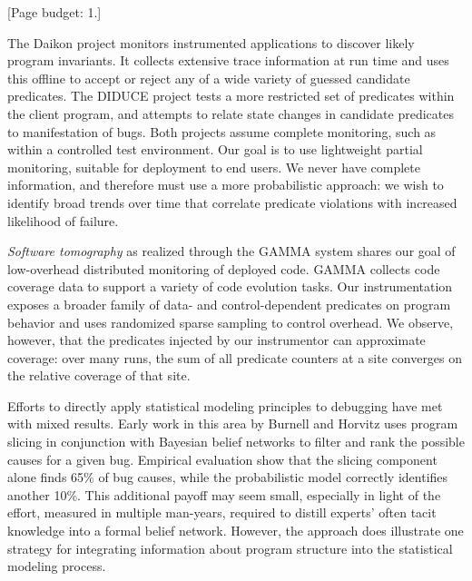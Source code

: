 \documentclass{sig-alternate}
\newcommand{\termdef}[1]{\textit{#1}}
\newcommand{\placeholder}[1]{{\color[cmyk]{0,0.61,0.87,0}[#1]}}
\begin{document}
\placeholder{Page budget: 1.}

The Daikon project \cite{ernst2001} monitors instrumented applications
to discover likely program invariants.  It collects extensive trace
information at run time and uses this offline to accept or reject any
of a wide variety of guessed candidate predicates.  The DIDUCE project
\cite{ICSE02*291} tests a more restricted set of predicates within the
client program, and attempts to relate state changes in candidate
predicates to manifestation of bugs.  Both projects assume complete
monitoring, such as within a controlled test environment.  Our goal is
to use lightweight partial monitoring, suitable for deployment to end
users.  We never have complete information, and therefore must use a
more probabilistic approach: we wish to identify broad trends over
time that correlate predicate violations with increased likelihood of
failure.

\termdef{Software tomography} as realized through the GAMMA system
\cite{PASTE'02*2,Orso:2003:LFDIART} shares our goal of low-overhead
distributed monitoring of deployed code.  GAMMA collects code coverage
data to support a variety of code evolution tasks.  Our
instrumentation exposes a broader family of data- and
control-dependent predicates on program behavior and uses randomized
sparse sampling to control overhead.  We observe, however, that the
predicates injected by our instrumentor can approximate coverage: over
many runs, the sum of all predicate counters at a site converges on
the relative coverage of that site.

Efforts to directly apply statistical modeling principles to debugging
have met with mixed results.  Early work in this area by Burnell and
Horvitz \cite{Burnell:1995:SCM} uses program slicing in conjunction
with Bayesian belief networks to filter and rank the possible causes
for a given bug.  Empirical evaluation show that the slicing component
alone finds 65\% of bug causes, while the probabilistic model
correctly identifies another 10\%.  This additional payoff may seem
small, especially in light of the effort, measured in multiple
man-years, required to distill experts' often tacit knowledge into a
formal belief network.  However, the approach does illustrate one
strategy for integrating information about program structure into the
statistical modeling process.
\end{document}
